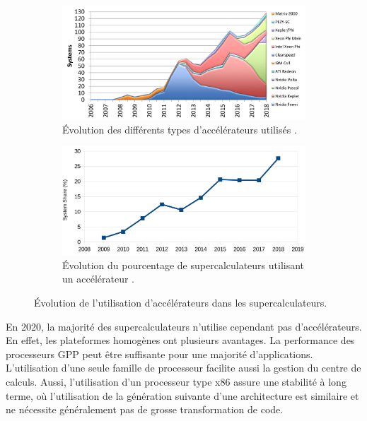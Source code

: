         
        

       \begin{figure}[t!]
            \centering
            \begin{subfigure}[t]{0.58\textwidth}
                \centering
                \includegraphics[width=\linewidth]{images/edl_gpu_top500.png}
                \caption{\label{fig:edl_gpu_top500} Évolution des différents types d'accélérateurs utilisés \cite{Strohmaier2018}.}
            \end{subfigure}\hfill
            \begin{subfigure}[t]{0.41\textwidth}
                \centering
                \includegraphics[width=\linewidth]{images/edl_hetero_share.png}
                \caption{\label{fig:edl_hetero_share} Évolution du pourcentage de supercalculateurs utilisant un accélérateur \cite{phdthesis}.}
            \end{subfigure}
            \caption{Évolution de l'utilisation d'accélérateurs dans les supercalculateurs.}
        \end{figure}
        
        
        En 2020, la majorité des supercalculateurs n'utilise cependant pas d'accélérateurs. En effet, les plateformes homogènes ont plusieurs avantages. La performance des processeurs GPP peut être suffisante pour une majorité d'applications. L'utilisation d'une seule famille de processeur facilite aussi la gestion du centre de calculs. Aussi, l'utilisation d'un processeur type x86 assure une stabilité à long terme, où l'utilisation de la génération suivante d'une architecture est similaire et ne nécessite généralement pas de grosse transformation de code. 
        
